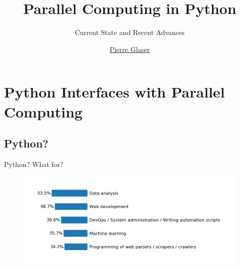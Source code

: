 \documentclass[14pt, usenames,dvipsnames]{beamer} %
\title{Parallel Computing in Python}
\subtitle{Current State and Recent Advances}
\author{\href{http://kbroman.org}{Pierre Glaser}}
\begin{document}
\begin{frame}[fragile]{}
    \titlepage
\end{frame}

\vspace{3em}

\begin{frame}[t]{}
    \center
    \vspace{3em}
    \tableofcontents[
        subsectionstyle=hide/hide/hide,
        sectionstyle=show
        ]
\end{frame}

\section{Python Interfaces with Parallel Computing}
    \subsection{Python? }
    \begin{frame}[t]{Python? What for?}
        \begin{figure}[htpb]
            \vspace*{-0.5cm}
            \hspace*{-1.3cm}
            \includegraphics[width=1.1\linewidth]{media/psf_usage_survey.png}
            \vspace*{-0.5cm}
            \caption{}
            \label{fig:media/better_screenshot_python_development_results}
        \end{figure}
    \end{frame}
\end{document}

